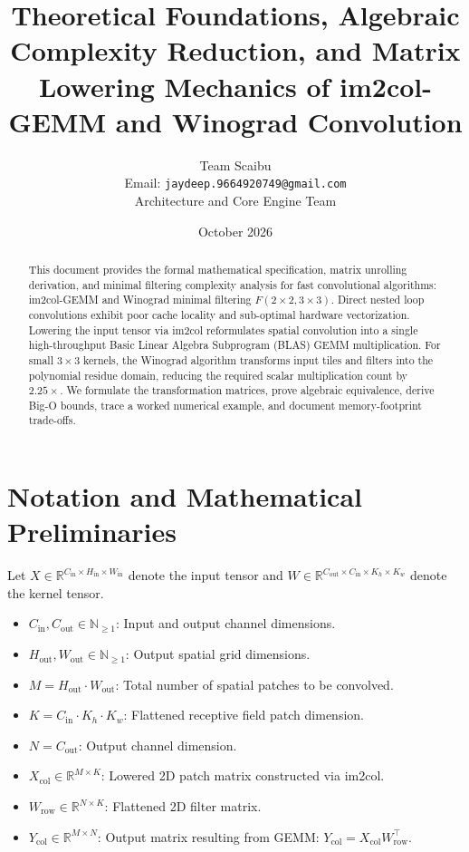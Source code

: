 \documentclass[11pt,a4paper]{article}
\title{\textbf{Theoretical Foundations, Algebraic Complexity Reduction, and Matrix Lowering Mechanics of im2col-GEMM and Winograd Convolution}}
\author{Team Scaibu \\ \small Email: \texttt{jaydeep.9664920749@gmail.com} \\ \small Architecture and Core Engine Team}
\date{October 2026}
\theoremstyle{definition}
\begin{document}
\maketitle

\begin{abstract}
This document provides the formal mathematical specification, matrix unrolling derivation, and minimal filtering complexity analysis for fast convolutional algorithms: im2col-GEMM and Winograd minimal filtering $F(2 \times 2, 3 \times 3)$. Direct nested loop convolutions exhibit poor cache locality and sub-optimal hardware vectorization. Lowering the input tensor via im2col reformulates spatial convolution into a single high-throughput Basic Linear Algebra Subprogram (BLAS) GEMM multiplication. For small $3 \times 3$ kernels, the Winograd algorithm transforms input tiles and filters into the polynomial residue domain, reducing the required scalar multiplication count by $2.25\times$. We formulate the transformation matrices, prove algebraic equivalence, derive Big-O bounds, trace a worked numerical example, and document memory-footprint trade-offs.
\end{abstract}

\section{Notation and Mathematical Preliminaries}

Let $X \in \mathbb{R}^{C_{\text{in}} \times H_{\text{in}} \times W_{\text{in}}}$ denote the input tensor and $W \in \mathbb{R}^{C_{\text{out}} \times C_{\text{in}} \times K_h \times K_w}$ denote the kernel tensor.

\begin{itemize}
    \item $C_{\text{in}}, C_{\text{out}} \in \mathbb{N}_{\ge 1}$: Input and output channel dimensions.
    \item $H_{\text{out}}, W_{\text{out}} \in \mathbb{N}_{\ge 1}$: Output spatial grid dimensions.
    \item $M = H_{\text{out}} \cdot W_{\text{out}}$: Total number of spatial patches to be convolved.
    \item $K = C_{\text{in}} \cdot K_h \cdot K_w$: Flattened receptive field patch dimension.
    \item $N = C_{\text{out}}$: Output channel dimension.
    \item $X_{\text{col}} \in \mathbb{R}^{M \times K}$: Lowered 2D patch matrix constructed via im2col.
    \item $W_{\text{row}} \in \mathbb{R}^{N \times K}$: Flattened 2D filter matrix.
    \item $Y_{\text{col}} \in \mathbb{R}^{M \times N}$: Output matrix resulting from GEMM: $Y_{\text{col}} = X_{\text{col}} W_{\text{row}}^\top$.
\end{itemize}
\end{document}
